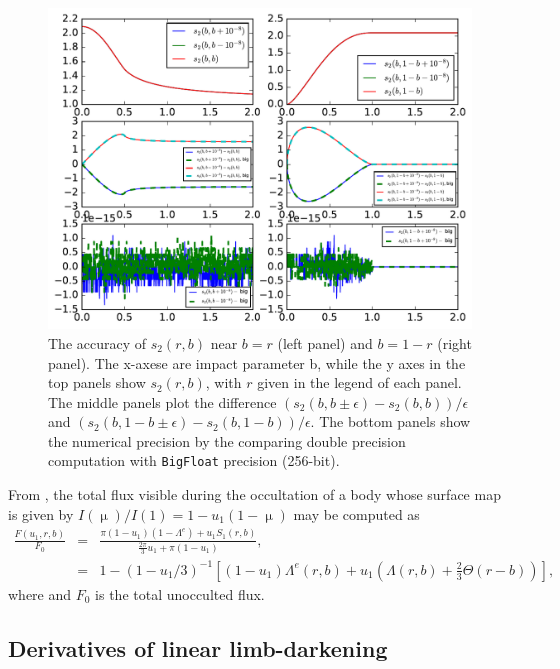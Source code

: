\documentclass[modern]{aastex61}
\begin{document}
\begin{figure}\label{s2_machine}
    \begin{centering}
    \includegraphics[width=\linewidth]{figures/julia/s2_machine.pdf}
    \caption{The accuracy of $s_2(r,b)$ near $b=r$ (left panel) and
    $b=1-r$ (right panel). The x-axese are impact parameter b,
    while the y axes in the top panels show $s_2(r,b)$, with $r$
    given in the legend of each panel. The middle panels plot
    the difference $(s_2(b,b\pm\epsilon)-s_2(b,b))/\epsilon$
    and $(s_2(b,1-b\pm\epsilon)-s_2(b,1-b))/\epsilon$. The bottom
    panels show the numerical precision by the comparing double precision
    computation with \texttt{BigFloat} precision (256-bit).}
    \end{centering}
\end{figure}


From \citet{MandelAgol2002}, the total flux visible during the occultation of a
body whose surface map is given by $I(\upmu)/I(1) = 1 - u_1(1 - \upmu)$ may be computed
as
\begin{eqnarray}
\frac{F(u_1,r,b)}{F_0} &=& \frac{\pi(1-u_1)(1-\Lambda^e)+ u_1 S_1(r,b)}{\frac{2\pi}{3}u_1 + \pi(1-u_1)},\\
&=& 1-(1-u_1/3)^{-1}\left[(1-u_1)\Lambda^e(r,b) + u_1\left(\Lambda(r,b)+\tfrac{2}{3}\Theta(r-b)\right)\right],
\end{eqnarray}
where
and $F_0$ is the total unocculted flux.  %

\subsection{Derivatives of linear limb-darkening}
\end{document}
